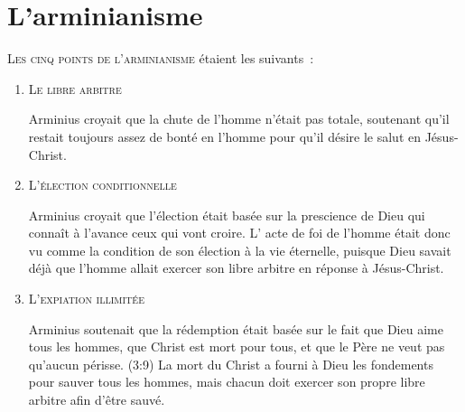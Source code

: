 \chapter{L'arminianisme}

\lettrine{L}{es \og cinq points de l'arminianisme \fg{}}\linebreak
 étaient les suivants~:

\begin{enumerate}
  \item  \textsc{Le libre arbitre}

\nobreak
\begin{pocketpar}{}
\begin{digestpar}{}
Arminius croyait que la chute de \pocketlinebreak
 l'homme
  n'était pas totale,
 soute\-nant qu'il restait toujours assez de bonté en l'homme
 pour qu'il désire le salut en Jésus-Christ.
\end{digestpar}
\end{pocketpar}

  \item  \textsc{L'élection conditionnelle}

\nobreak
\begin{digestpar}{}
Arminius croyait que l'élection\pocketlinebreak
 était basée sur la prescience
 de\pocketlinebreak
 Dieu qui connaît à l'avance ceux qui vont croire.
 L' \og acte de foi \fg{} de l'homme était donc vu comme la \og condition \fg{} 
 de son élection à la vie éternelle, puisque Dieu savait déjà
 que l'homme allait exercer son \og libre arbitre \fg{}
 en réponse à Jésus-Christ.
\end{digestpar}

  \item  \textsc{L'expiation illimitée}

\nobreak
\begin{pocketpar}{}
\begin{digestpar}{}
Arminius soutenait que la rédemption était basée sur le fait
 que Dieu aime tous les hom\-mes, que Christ est mort pour tous,
 et que le Père ne veut pas qu'aucun périsse.
 (3:9)
 La mort du Christ a fourni à Dieu les fondements
 pour sauver tous les
 hommes, mais chacun doit exercer son propre
 \og libre arbitre \fg{} afin
 d'être sauvé.
\end{digestpar}
\end{pocketpar}


\end{enumerate}
